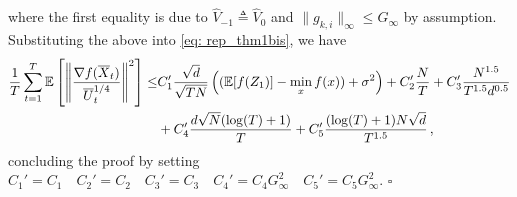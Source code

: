 \documentclass[anon,12pt]{colt2021} %
\begin{document}
where the first equality is due to $\hat V_{-1} \triangleq \hat V_0$ and $\|g_{k,i}\|_{\infty} \leq G_{\infty}$ by assumption.
Substituting the above into \eqref{eq: rep_thm1bis}, we have 
\begin{align}\notag
\begin{split}
	 \frac{1}{T}\sum_{t=1}^T  \mathbb E \left [\left\|\frac{\nabla f( \overline X_{t})}{\overline U_{t}^{1/4}}\right\|^2  \right] 
	\leq  & C_1' \frac{\sqrt{d}}{\sqrt{TN}} \left(( \mathbb E  [f( Z_{1})]  -  \min_x  f(x)) +    \sigma^2 \right)  +  C_2' \frac{N}{T}  +  C_3' \frac{N^{1.5}}{T^{1.5}d^{0.5}} 
	\nonumber \\
    &+  C_4' \frac{d\sqrt{N}(\log(T)+1)}{T} +  C_5'   \frac{(\log(T)+1)N\sqrt{d}}{T^{1.5}}\,,
\end{split}
\end{align}
concluding the proof by setting $C_1' = C_1 \quad C_2' = C_2 \quad C_3' = C_3 \quad C_4' = C_4G_{\infty}^2 \quad C_5' = C_5 G_{\infty}^2$. \hfill $\square$
\end{document}
